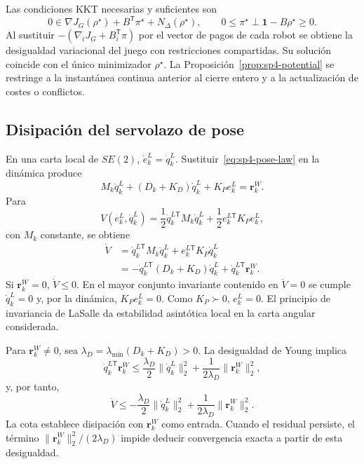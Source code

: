 Las condiciones KKT necesarias y suficientes son
\[
 0\in\nabla J_G(\rho^\star)+B^{\mathsf T}\pi^\star
 +N_{\Delta}(\rho^\star),
 \qquad
 0\leq\pi^\star\perp\boldsymbol1-B\rho^\star\geq0.
\]
Al sustituir $-(\nabla_iJ_G+B_i^{\mathsf T}\pi)$ por el vector de pagos de cada robot se obtiene la desigualdad variacional del juego con restricciones compartidas. Su solución coincide con el único minimizador \(\rho^\star\). La Proposición~\ref{prop:sp4-potential} se restringe a la instantánea continua anterior al cierre entero y a la actualización de costes o conflictos.

\subsection{Disipación del servolazo de pose}
\label{app:sp4-pose-proof}

En una carta local de $SE(2)$, $\dot e_k^L=\dot q_k^L$. Sustituir~\eqref{eq:sp4-pose-law} en la dinámica produce
\[
 M_k\ddot q_k^L+(D_k+K_D)\dot q_k^L+K_Pe_k^L=\boldsymbol r_k^W.
\]
Para
\[
 V(e_k^L,\dot q_k^L)=
 \frac12\dot q_k^{L\mathsf T}M_k\dot q_k^L
 +\frac12e_k^{L\mathsf T}K_Pe_k^L,
\]
con $M_k$ constante, se obtiene
\begin{align*}
 \dot V
 &=\dot q_k^{L\mathsf T}M_k\ddot q_k^L
   +e_k^{L\mathsf T}K_P\dot q_k^L\\
 &=-\dot q_k^{L\mathsf T}(D_k+K_D)\dot q_k^L
   +\dot q_k^{L\mathsf T}\boldsymbol r_k^W.
\end{align*}
Si $\boldsymbol r_k^W=0$, $\dot V\leq0$. En el mayor conjunto invariante contenido en $\dot V=0$ se cumple $\dot q_k^L=0$ y, por la dinámica, $K_Pe_k^L=0$. Como $K_P\succ0$, $e_k^L=0$. El principio de invariancia de LaSalle da estabilidad asintótica local en la carta angular considerada.

Para $\boldsymbol r_k^W\neq0$, sea $\lambda_D=\lambda_{\min}(D_k+K_D)>0$. La desigualdad de Young implica
\[
 \dot q_k^{L\mathsf T}\boldsymbol r_k^W
 \leq\frac{\lambda_D}{2}\|\dot q_k^L\|_2^2
 +\frac{1}{2\lambda_D}\|\boldsymbol r_k^W\|_2^2,
\]
y, por tanto,
\[
 \dot V\leq-\frac{\lambda_D}{2}\|\dot q_k^L\|_2^2
 +\frac{1}{2\lambda_D}\|\boldsymbol r_k^W\|_2^2.
\]
La cota establece disipación con \(\boldsymbol r_k^W\) como entrada. Cuando el residual persiste, el término \(\|\boldsymbol r_k^W\|_2^2/(2\lambda_D)\) impide deducir convergencia exacta a partir de esta desigualdad.
